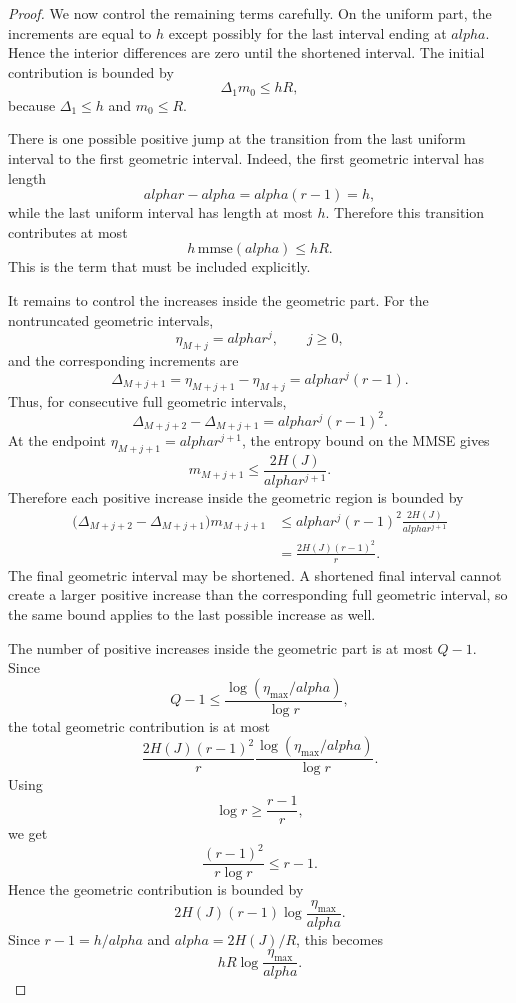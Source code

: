 \documentclass[11pt]{article}
\def\alpha{alpha}%
\newcommand{\mmse}{\mathrm{mmse}}
\begin{document}
\begin{proof}
We now control the remaining terms carefully. On the uniform part, the increments are equal to $h$ except possibly for the last interval ending at $\alpha$. Hence the interior differences are zero until the shortened interval. The initial contribution is bounded by
\[
    \Delta_1m_0\le hR,
\]
because $\Delta_1\le h$ and $m_0\le R$.

There is one possible positive jump at the transition from the last uniform interval to the first geometric interval. Indeed, the first geometric interval has length
\[
    \alpha r-\alpha=\alpha(r-1)=h,
\]
while the last uniform interval has length at most $h$. Therefore this transition contributes at most
\[
    h\,\mmse(\alpha)\le hR.
\]
This is the term that must be included explicitly.

It remains to control the increases inside the geometric part. For the nontruncated geometric intervals,
\[
    \eta_{M+j}=\alpha r^j,
    \qquad
    j\ge 0,
\]
and the corresponding increments are
\[
    \Delta_{M+j+1}
    =
    \eta_{M+j+1}-\eta_{M+j}
    =
    \alpha r^j(r-1).
\]
Thus, for consecutive full geometric intervals,
\[
    \Delta_{M+j+2}-\Delta_{M+j+1}
    =
    \alpha r^j(r-1)^2 .
\]
At the endpoint $\eta_{M+j+1}=\alpha r^{j+1}$, the entropy bound on the MMSE gives
\[
    m_{M+j+1}
    \le
    \frac{2H(J)}{\alpha r^{j+1}} .
\]
Therefore each positive increase inside the geometric region is bounded by
\[
\begin{aligned}
    \bigl(\Delta_{M+j+2}-\Delta_{M+j+1}\bigr)m_{M+j+1}
    &\le
    \alpha r^j(r-1)^2
    \frac{2H(J)}{\alpha r^{j+1}}  \\
    &=
    \frac{2H(J)(r-1)^2}{r}.
\end{aligned}
\]
The final geometric interval may be shortened. A shortened final interval cannot create a larger positive increase than the corresponding full geometric interval, so the same bound applies to the last possible increase as well.

The number of positive increases inside the geometric part is at most $Q-1$. Since
\[
    Q-1
    \le
    \frac{\log(\eta_{\max}/\alpha)}{\log r},
\]
the total geometric contribution is at most
\[
    \frac{2H(J)(r-1)^2}{r}
    \frac{\log(\eta_{\max}/\alpha)}{\log r}.
\]
Using
\[
    \log r\ge \frac{r-1}{r},
\]
we get
\[
    \frac{(r-1)^2}{r\log r}
    \le r-1.
\]
Hence the geometric contribution is bounded by
\[
    2H(J)(r-1)
    \log\frac{\eta_{\max}}{\alpha}.
\]
Since $r-1=h/\alpha$ and $\alpha=2H(J)/R$, this becomes
\[
    hR\log\frac{\eta_{\max}}{\alpha}.
\]


\end{proof}
\end{document}
